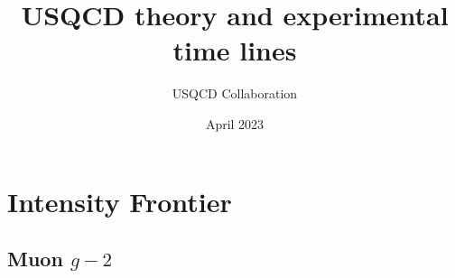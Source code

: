 \documentclass[prd,showpacs,showkeys,preprintnumbers,floatfix,
nofootinbib%
]{revtex4-2}
\begin{document}

\title{USQCD theory and experimental time lines}
\author{USQCD Collaboration}
\date{April 2023}


\maketitle
\tableofcontents
\section{Intensity Frontier}\label{sec:intensity}

\subsection{Muon $g-2$}
\end{document}
